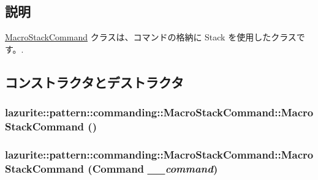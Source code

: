 \subsection{説明}
\hyperlink{classlazurite_1_1pattern_1_1commanding_1_1_macro_stack_command}{MacroStackCommand} クラスは、コマンドの格納に Stack を使用したクラスです。. 

\subsection{コンストラクタとデストラクタ}
\hypertarget{classlazurite_1_1pattern_1_1commanding_1_1_macro_stack_command_a58a5ca1c3b45634264595f53f8e075c6}{
\subsubsection[{MacroStackCommand}]{\setlength{\rightskip}{0pt plus 5cm}lazurite::pattern::commanding::MacroStackCommand::MacroStackCommand ()}}
\label{classlazurite_1_1pattern_1_1commanding_1_1_macro_stack_command_a58a5ca1c3b45634264595f53f8e075c6}
\hypertarget{classlazurite_1_1pattern_1_1commanding_1_1_macro_stack_command_ac765573df5f3edc2313ea77a18afd46d}{
\subsubsection[{MacroStackCommand}]{\setlength{\rightskip}{0pt plus 5cm}lazurite::pattern::commanding::MacroStackCommand::MacroStackCommand ({\bf Command} {\em \_\-\_\-command})}}
\label{classlazurite_1_1pattern_1_1commanding_1_1_macro_stack_command_ac765573df5f3edc2313ea77a18afd46d}

